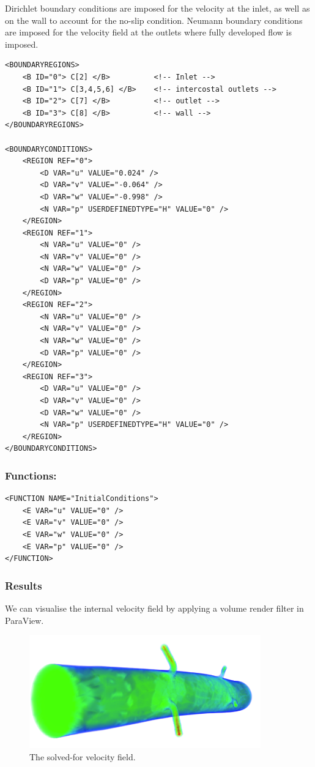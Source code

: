 Dirichlet boundary conditions are imposed for the velocity at the inlet, as well as on the wall to account for the no-slip condition. Neumann boundary conditions are imposed for the velocity field at the outlets where fully developed flow is imposed.

\begin{lstlisting}[style=XMLStyle]
<BOUNDARYREGIONS>
	<B ID="0"> C[2] </B>          <!-- Inlet -->
	<B ID="1"> C[3,4,5,6] </B>    <!-- intercostal outlets -->
	<B ID="2"> C[7] </B>          <!-- outlet -->
	<B ID="3"> C[8] </B>          <!-- wall -->
</BOUNDARYREGIONS>
      
<BOUNDARYCONDITIONS>
	<REGION REF="0">
		<D VAR="u" VALUE="0.024" />
		<D VAR="v" VALUE="-0.064" />
		<D VAR="w" VALUE="-0.998" />
		<N VAR="p" USERDEFINEDTYPE="H" VALUE="0" />
	</REGION>
	<REGION REF="1">
		<N VAR="u" VALUE="0" />
		<N VAR="v" VALUE="0" />
		<N VAR="w" VALUE="0" />
		<D VAR="p" VALUE="0" />
	</REGION> 
	<REGION REF="2">
		<N VAR="u" VALUE="0" />
		<N VAR="v" VALUE="0" />
		<N VAR="w" VALUE="0" />
		<D VAR="p" VALUE="0" />
	</REGION> 
	<REGION REF="3">
		<D VAR="u" VALUE="0" />
		<D VAR="v" VALUE="0" />
		<D VAR="w" VALUE="0" />
		<N VAR="p" USERDEFINEDTYPE="H" VALUE="0" />
	</REGION> 
</BOUNDARYCONDITIONS>
\end{lstlisting}

\subsubsection{Functions:~} 
\begin{lstlisting}[style=XMLStyle]
<FUNCTION NAME="InitialConditions">
	<E VAR="u" VALUE="0" />
	<E VAR="v" VALUE="0" />
	<E VAR="w" VALUE="0" />
	<E VAR="p" VALUE="0" />
</FUNCTION>
\end{lstlisting}

\subsubsection{Results}
We can visualise the internal velocity field by applying a volume render filter in ParaView. 

\begin{figure}
\begin{center}
\includegraphics[width=10cm]{Figures/velocityRendered.png}
\caption{The solved-for velocity field.}
\end{center}
\end{figure}

